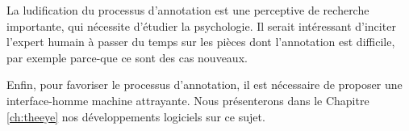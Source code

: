 La ludification du processus d'annotation est une perceptive de recherche importante, qui nécessite d'étudier la psychologie.
Il serait intéressant d'inciter l'expert humain à passer du temps sur les pièces dont l'annotation est difficile, par exemple parce-que ce sont des cas nouveaux.

Enfin, pour favoriser le processus d'annotation, il est nécessaire de proposer une interface-homme machine attrayante.
Nous présenterons dans le Chapitre \ref{ch:theeye} nos développements logiciels sur ce sujet.
